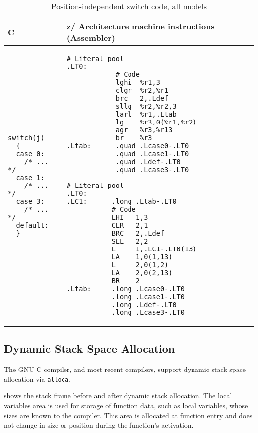 \documentclass[english,11pt,twoside,toc=bib,toc=idx]{scrreprt}
\newcommand{\ARCH}{z/\kern-1pt Ar\-chi\-tec\-ture}
\newcommand{\ARCH}{ESA/390}
\newenvironment{DIFnomarkup}{}{} %
\begin{document}
\begin{table}
  \centering
  \begin{DIFnomarkup}
  \begin{tabular}{p{}p{}}
    \toprule
    C & \ARCH{} machine instructions (Assembler) \\
    \midrule
\begin{lstlisting}[style=short]
switch(j)
  {
  case 0:
    /* ... */
  case 1:
    /* ... */
  case 3:
    /* ... */
  default:
  }
\end{lstlisting}
    &
\ifzseries
\begin{lstlisting}[style=short,language=simpleasm]
            # Literal pool
.LT0:
            # Code
            lghi  %r1,3
            clgr  %r2,%r1
            brc   2,.Ldef
            sllg  %r2,%r2,3
            larl  %r1,.Ltab
            lg    %r3,0(%r1,%r2)
            agr   %r3,%r13
            br    %r3
.Ltab:      .quad .Lcase0-.LT0
            .quad .Lcase1-.LT0
            .quad .Ldef-.LT0
            .quad .Lcase3-.LT0
\end{lstlisting}
\else
\begin{lstlisting}[style=short,language=simpleasm]
           # Literal pool
.LT0:
.LC1:      .long .Ltab-.LT0
           # Code
           LHI   1,3
           CLR   2,1
           BRC   2,.Ldef
           SLL   2,2
           L     1,.LC1-.LT0(13)
           LA    1,0(1,13)
           L     2,0(1,2)
           LA    2,0(2,13)
           BR    2
.Ltab:     .long .Lcase0-.LT0
           .long .Lcase1-.LT0
           .long .Ldef-.LT0
           .long .Lcase3-.LT0
\end{lstlisting}
\fi \\
    \bottomrule
  \end{tabular}
  \end{DIFnomarkup}
  \caption{Position-independent switch code, all models}
  \label{tab:indswitch}
\end{table}

\subsection{Dynamic Stack Space Allocation}
\label{dynamicstack}
The GNU C compiler, and most recent compilers, support dynamic stack
space allocation via \texttt{alloca}.

 shows the stack frame before and after dynamic
stack allocation.  The local variables area is used for storage of
function data, such as local variables, whose sizes are known to the
compiler.  This area is allocated at function entry and does not
change in size or position during the function's activation.
\end{document}
